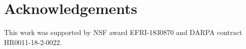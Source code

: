 
\section*{Acknowledgements}

This work was supported by 
NSF award EFRI-1830870 
and
DARPA contract HR0011-18-2-0022.


